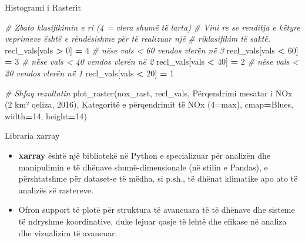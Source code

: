 \documentclass[
  ignorenonframetext,
]{beamer}
\newenvironment{Shaded}{\begin{snugshade}}{\end{snugshade}}
\newcommand{\CommentTok}[1]{\textcolor[rgb]{0.56,0.35,0.01}{\textit{#1}}}
\newcommand{\DecValTok}[1]{\textcolor[rgb]{0.00,0.00,0.81}{#1}}
\newcommand{\NormalTok}[1]{#1}
\newcommand{\OperatorTok}[1]{\textcolor[rgb]{0.81,0.36,0.00}{\textbf{#1}}}
\newcommand{\StringTok}[1]{\textcolor[rgb]{0.31,0.60,0.02}{#1}}
\begin{document}
\begin{frame}[fragile]{Histogrami i Rasterit}
\protect\hypertarget{histogrami-i-rasterit-5}{}

\begin{Shaded}
\begin{Highlighting}[]
\CommentTok{\# Zbato klasifikimin e ri (4 = vlera shumë të larta)}
\CommentTok{\# Vini re se renditja e këtyre veprimeve është e rëndësishme për të realizuar një}
\CommentTok{\# riklasifikim të saktë.}
\NormalTok{recl\_vals[vals }\OperatorTok{\textgreater{}} \DecValTok{0}\NormalTok{] }\OperatorTok{=} \DecValTok{4}
\CommentTok{\# nëse vals \textless{} 60 vendos vlerën në 3}
\NormalTok{recl\_vals[vals }\OperatorTok{\textless{}} \DecValTok{60}\NormalTok{] }\OperatorTok{=} \DecValTok{3}
\CommentTok{\# nëse vals \textless{} 40 vendos vlerën në 2}
\NormalTok{recl\_vals[vals }\OperatorTok{\textless{}} \DecValTok{40}\NormalTok{] }\OperatorTok{=} \DecValTok{2}
\CommentTok{\# nëse vals \textless{} 20 vendos vlerën në 1}
\NormalTok{recl\_vals[vals }\OperatorTok{\textless{}} \DecValTok{20}\NormalTok{] }\OperatorTok{=} \DecValTok{1}

\CommentTok{\# Shfaq rezultatin}
\NormalTok{plot\_raster(nox\_rast, recl\_vals, }\StringTok{\textquotesingle{}Përqendrimi mesatar i NOx (2 km² qeliza, 2016)\textquotesingle{}}\NormalTok{, }
    \StringTok{\textquotesingle{}Kategoritë e përqendrimit të NOx (4=max)\textquotesingle{}}\NormalTok{, cmap}\OperatorTok{=}\StringTok{\textquotesingle{}Blues\textquotesingle{}}\NormalTok{, width}\OperatorTok{=}\DecValTok{14}\NormalTok{, height}\OperatorTok{=}\DecValTok{14}\NormalTok{)}
\end{Highlighting}
\end{Shaded}
\end{frame}

\begin{frame}{Libraria xarray}
\protect\hypertarget{libraria-xarray}{}
\begin{itemize}
\item
  \textbf{xarray} është një bibliotekë në Python e specializuar për
  analizën dhe manipulimin e të dhënave shumë-dimensionale (në stilin e
  Pandas), e përshtatshme për dataset-e të mëdha, si p.sh., të dhënat
  klimatike apo ato të analizës së rastereve.
\item
  Ofron support të plotë për struktura të avancuara të të dhënave dhe
  sisteme të ndryshme koordinative, duke lejuar qasje të lehtë dhe
  efikase në analiza dhe vizualizim të avancuar.
\end{itemize}
\end{frame}
\end{document}
